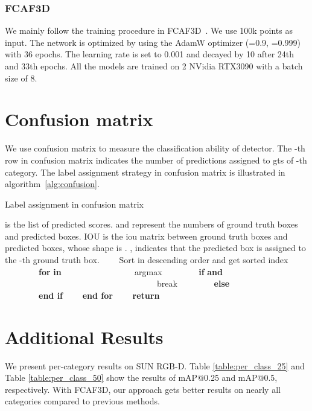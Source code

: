\documentclass[runningheads]{llncs}
\begin{document}
\subsubsection{FCAF3D}
We mainly follow the training procedure in FCAF3D~\cite{rukhovich2021fcaf3d}. We use 100k points as input. The network is optimized by using the AdamW optimizer (=0.9, =0.999) with 36 epochs. The learning rate is set to 0.001 and decayed by 10 after 24th and 33th epochs. All the models are trained on 2 NVidia RTX3090 with a batch size of 8.

\section{Confusion matrix}
We use confusion matrix to measure the classification ability of detector. The -th row in confusion matrix indicates the number of predictions assigned to gts of -th category. The label assignment strategy in confusion matrix is illustrated in algorithm~\ref{alg:confusion}.

\begin{algorithm}
\caption{Label assignment in confusion matrix}
\label{alg:confusion}
\begin{algorithmic}
  is the list of predicted scores.  and  represent the numbers of ground truth boxes and predicted boxes. IOU is the iou matrix between ground truth boxes and predicted boxes, whose shape is .
 ,  indicates that the predicted box  is assigned to the -th ground truth box.
\State \ \ \ \ Sort  in descending order and get sorted index 
\State \ \ \ \ 
\State \ \ \ \ {\bfseries for}  {\bfseries in} 
\State  \ \ \ \ \ \ \ \   
\State \ \ \ \ \ \ \ \  argmax 
\State \ \ \ \ \ \ \ \ {\bfseries if}  {\bfseries and} 
\State \ \ \ \ \ \ \ \ \ \ \ \  
\State \ \ \ \ \ \ \ \ \ \ \ \  
\State \ \ \ \ \ \ \ \ \ \ \ \  break
\State \ \ \ \ \ \ \ \ {\bfseries else}
\State \ \ \ \ \ \ \ \ \ \ \ \   
\State \ \ \ \ \ \ \ \ {\bfseries end if}
\State \ \ \ \ {\bfseries end for}
\State \ \ \ \ {\bfseries return} 
\State {\bfseries end}

\end{algorithmic}
\end{algorithm}


\section{Additional Results}
We present per-category results on SUN RGB-D. Table \ref{table:per_class_25} and Table \ref{table:per_class_50} show the results of mAP@0.25 and mAP@0.5, respectively. With FCAF3D, our approach gets better results on nearly all categories compared to previous methods.
\end{document}

